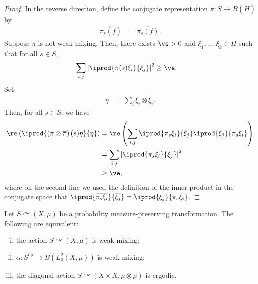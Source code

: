 \documentclass[10pt]{mypackage}
\begin{document}
\begin{proof}
  In the reverse direction, define the conjugate representation $ \overline{\pi}\colon S\to B\left( \overline{H} \right) $ by
  \begin{align*}
    \overline{\pi}_s\left( \overline{f} \right) &= \overline{\pi_s\left( f \right)}.
  \end{align*}
  Suppose $\pi$ is not weak mixing. Then, there exists $\ve > 0$ and $\xi_1,\dots,\xi_k\in H$ such that for all $s\in S$,
  \begin{align*}
    \sum_{i,j} \left\vert \iprod{\pi(s)\xi_i}{\xi_j} \right\vert^2 &\geq \ve.
  \end{align*}
  Set
  \begin{align*}
    \eta &= \sum_{i} \xi_i\otimes \overline{\xi_i}.
  \end{align*}
  Then, for all $s\in S$, we have
  \begin{align*}
    \re\left( \iprod{\left( \pi\otimes \overline{\pi} \right)(s)\eta}{\eta} \right) &= \re\left( \sum_{i,j}\iprod{\pi_s \xi_i}{\xi_j} \iprod{\xi_j}{\pi_s\xi_i} \right)\\
                                                                                    &= \sum_{i,j} \left\vert \iprod{\pi_s\xi_i}{\xi_j} \right\vert^2\\
                                                                                    &\geq \ve,
  \end{align*}
  where on the second line we used the definition of the inner product in the conjugate space that $ \iprod{ \overline{\pi_s\xi_i} }{ \overline{\xi_j} } = \iprod{\xi_j}{\pi_s\xi_i} $.
\end{proof}
\begin{theorem}
  Let $S\curvearrowright \left( X,\mu \right)$ be a probability measure-preserving transformation. The following are equivalent:
  \begin{enumerate}[(i)]
    \item the action $S\curvearrowright \left( X,\mu \right)$ is weak mixing;
    \item $\alpha\colon S^{\operatorname{op}}\rightarrow B\left( L^2_0\left( X,\mu \right) \right)$ is weak mixing;
    \item the diagonal action $S\curvearrowright \left( X\times X,\mu\otimes \mu \right)$ is ergodic.
  \end{enumerate}
\end{theorem}
\end{document}
